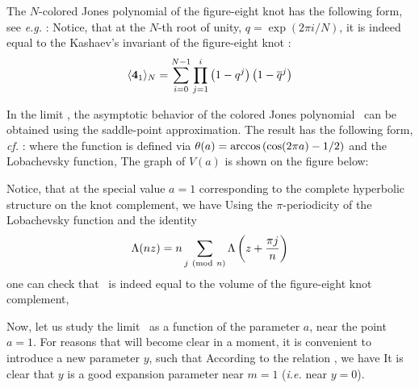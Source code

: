 

The $N$-colored Jones polynomial of the figure-eight knot
has the following form, see {\it e.g.} \KaulG:
%
\eqn{}
%
Notice, that at the $N$-th root of unity, $q = \exp (2\pi i/N)$,
it is indeed equal to the Kashaev's invariant of
the figure-eight knot \Kashaev:
$$
\langle {\bf 4}_1 \rangle_N = \sum_{i=0}^{N-1} \prod_{j=1}^i 
\left( 1- q^j \right) \left( 1- \bar q^j \right)
$$

In the limit \thelimit,
the asymptotic behavior of the colored Jones polynomial \njoneseight\
can be obtained using the saddle-point approximation.
The result has the following form, {\it cf.} \MurakamiMahler:
%
\eqn{}
%
where the function
%
\eqn{}
%
is defined via
$\th (a) = \arccos \left( \cos (2\pi a) - 1/2 \right)$
and the Lobachevsky function,
%
\eqn{}
%
The graph of $V(a)$ is shown on the figure below:

\ifig{}
{\epsfxsize3in\epsfbox{volume41.eps}}

Notice, that at the special value $a=1$ corresponding
to the complete hyperbolic structure on the knot complement,
we have
%
\eqn{}
%
Using the $\pi$-periodicity of the Lobachevsky function
and the identity
$$
\Lambda (nz)
= n \sum_{j~({\rm mod}~n)} \Lambda \left( z + {\pi j \over n} \right)
$$
one can check that \kashlimiteight\ is indeed equal to
the volume of the figure-eight knot complement,
%
\eqn{}
%

Now, let us study the limit \limiteight\ as a function of
the parameter $a$, near the point $a=1$.
For reasons that will become clear in a moment, it is convenient
to introduce a new parameter $y$, such that
%
\eqn{}
%
According to the relation \mvalue, we have
%
\eqn{}
%
It is clear that $y$ is a good expansion parameter near
$m=1$ ({\it i.e.} near $y=0$).

